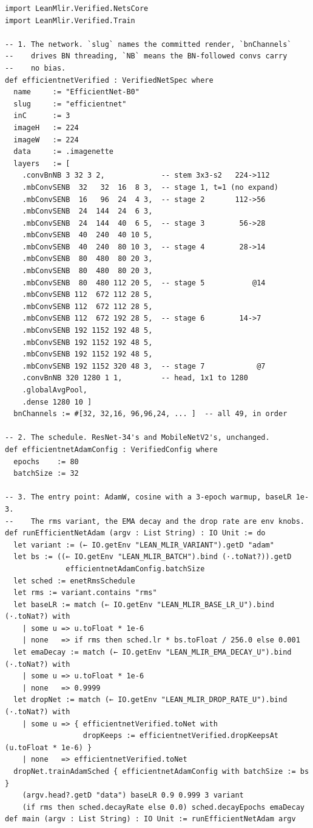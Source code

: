 \begin{verbatim}
import LeanMlir.Verified.NetsCore
import LeanMlir.Verified.Train

-- 1. The network. `slug` names the committed render, `bnChannels`
--    drives BN threading, `NB` means the BN-followed convs carry
--    no bias.
def efficientnetVerified : VerifiedNetSpec where
  name     := "EfficientNet-B0"
  slug     := "efficientnet"
  inC      := 3
  imageH   := 224
  imageW   := 224
  data     := .imagenette
  layers   := [
    .convBnNB 3 32 3 2,             -- stem 3x3-s2   224->112
    .mbConvSENB  32   32  16  8 3,  -- stage 1, t=1 (no expand)
    .mbConvSENB  16   96  24  4 3,  -- stage 2       112->56
    .mbConvSENB  24  144  24  6 3,
    .mbConvSENB  24  144  40  6 5,  -- stage 3        56->28
    .mbConvSENB  40  240  40 10 5,
    .mbConvSENB  40  240  80 10 3,  -- stage 4        28->14
    .mbConvSENB  80  480  80 20 3,
    .mbConvSENB  80  480  80 20 3,
    .mbConvSENB  80  480 112 20 5,  -- stage 5           @14
    .mbConvSENB 112  672 112 28 5,
    .mbConvSENB 112  672 112 28 5,
    .mbConvSENB 112  672 192 28 5,  -- stage 6        14->7
    .mbConvSENB 192 1152 192 48 5,
    .mbConvSENB 192 1152 192 48 5,
    .mbConvSENB 192 1152 192 48 5,
    .mbConvSENB 192 1152 320 48 3,  -- stage 7            @7
    .convBnNB 320 1280 1 1,         -- head, 1x1 to 1280
    .globalAvgPool,
    .dense 1280 10 ]
  bnChannels := #[32, 32,16, 96,96,24, ... ]  -- all 49, in order

-- 2. The schedule. ResNet-34's and MobileNetV2's, unchanged.
def efficientnetAdamConfig : VerifiedConfig where
  epochs    := 80
  batchSize := 32

-- 3. The entry point: AdamW, cosine with a 3-epoch warmup, baseLR 1e-3.
--    The rms variant, the EMA decay and the drop rate are env knobs.
def runEfficientNetAdam (argv : List String) : IO Unit := do
  let variant := (← IO.getEnv "LEAN_MLIR_VARIANT").getD "adam"
  let bs := ((← IO.getEnv "LEAN_MLIR_BATCH").bind (·.toNat?)).getD
              efficientnetAdamConfig.batchSize
  let sched := enetRmsSchedule
  let rms := variant.contains "rms"
  let baseLR := match (← IO.getEnv "LEAN_MLIR_BASE_LR_U").bind (·.toNat?) with
    | some u => u.toFloat * 1e-6
    | none   => if rms then sched.lr * bs.toFloat / 256.0 else 0.001
  let emaDecay := match (← IO.getEnv "LEAN_MLIR_EMA_DECAY_U").bind (·.toNat?) with
    | some u => u.toFloat * 1e-6
    | none   => 0.9999
  let dropNet := match (← IO.getEnv "LEAN_MLIR_DROP_RATE_U").bind (·.toNat?) with
    | some u => { efficientnetVerified.toNet with
                  dropKeeps := efficientnetVerified.dropKeepsAt (u.toFloat * 1e-6) }
    | none   => efficientnetVerified.toNet
  dropNet.trainAdamSched { efficientnetAdamConfig with batchSize := bs }
    (argv.head?.getD "data") baseLR 0.9 0.999 3 variant
    (if rms then sched.decayRate else 0.0) sched.decayEpochs emaDecay
def main (argv : List String) : IO Unit := runEfficientNetAdam argv
\end{verbatim}

